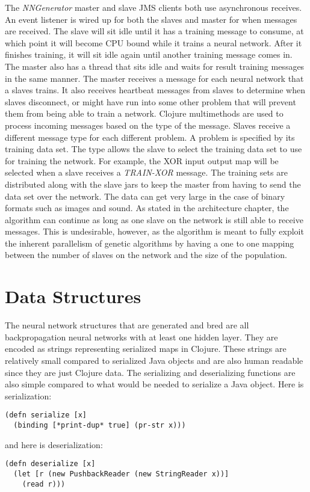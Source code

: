 The {\em NNGenerator} master and slave JMS clients both use asynchronous receives.
An event listener is wired up for both the slaves and master for when messages are received. 
The slave will sit idle until it has a training message to consume, at which point it will become CPU bound while it trains a neural network.
After it finishes training, it will sit idle again until another training message comes in.
The master also has a thread that sits idle and waits for result training messages in the same manner.
The master receives a message for each neural network that a slaves trains. 
It also receives heartbeat messages from slaves to determine when slaves disconnect, or might have run into some other problem that will prevent them from being able to train a network. 
Clojure multimethods are used to process incoming messages based on the type of the message. 
Slaves receive a different message type for each different problem. A problem is specified by its training data set. 
The type allows the slave to select the training data set to use for training the network. 
For example, the XOR input output map will be selected when a slave receives a {\em TRAIN-XOR} message. 
The training sets are distributed along with the slave jars to keep the master from having to send the data set over the network. 
The data can get very large in the case of binary formats such as images and sound. 
As stated in the architecture chapter, the algorithm can continue as long as one slave on the network is still able to receive messages. 
This is undesirable, however, as the algorithm is meant to fully exploit the inherent parallelism of genetic algorithms by having a one to one mapping between the number of slaves on the network and the size of the population. 

\section{Data Structures}
The neural network structures that are generated and bred are all backpropagation neural networks with at least one hidden layer. 
They are encoded as strings representing serialized maps in Clojure. 
These strings are relatively small compared to serialized Java objects and are also human readable since they are just Clojure data. 
The serializing and deserializing functions are also simple compared to what would be needed to serialize a Java object. Here is serialization: 

\lstset{language=Clojure}

\begin{lstlisting}
(defn serialize [x]
  (binding [*print-dup* true] (pr-str x)))
\end{lstlisting}

and here is deserialization:

\begin{lstlisting}
(defn deserialize [x]
  (let [r (new PushbackReader (new StringReader x))]
    (read r)))
\end{lstlisting}


